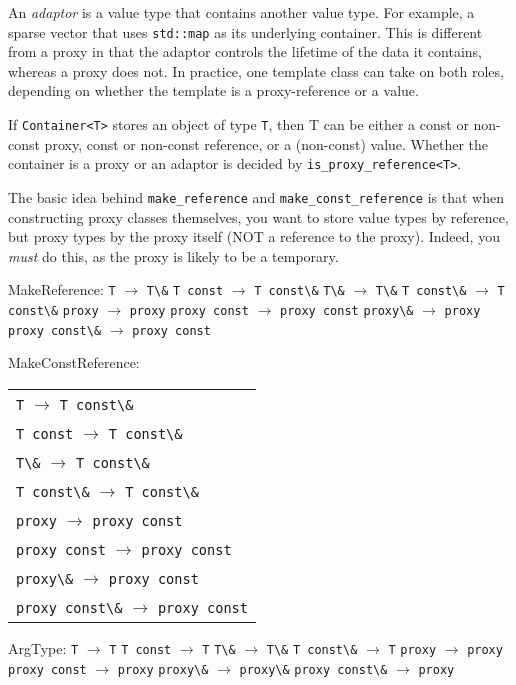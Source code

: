 \documentclass{article}
\begin{document}
An \textit{adaptor} is a value type that contains another value type.
For example, a sparse vector that uses \verb"std::map" as its
underlying container. This is different from a proxy in that the
adaptor controls the lifetime of the data it contains, whereas a proxy
does not. In practice, one template class can take on both roles,
depending on whether the template is a proxy-reference or a value.

If \verb"Container<T>" stores an object of type \verb"T", then T can
be either a const or non-const proxy, const or non-const reference, or
a (non-const) value. Whether the container is a proxy or an adaptor is
decided by \verb"is_proxy_reference<T>".

The basic idea behind \verb"make_reference" and \verb"make_const_reference"
is that when constructing proxy classes themselves, you want to store
value types by reference, but proxy types by the proxy itself (NOT a
reference to the proxy). Indeed, you \textit{must} do this, as the 
proxy is likely to be a temporary.

MakeReference:
\verb"T" $\rightarrow$ \verb"T\&"
\verb"T const" $\rightarrow$ \verb"T const\&"
\verb"T\&" $\rightarrow$ \verb"T\&"
\verb"T const\&" $\rightarrow$ \verb"T const\&"
\verb"proxy" $\rightarrow$ \verb"proxy"
\verb"proxy const" $\rightarrow$ \verb"proxy const"
\verb"proxy\&" $\rightarrow$ \verb"proxy"
\verb"proxy const\&" $\rightarrow$ \verb"proxy const"

MakeConstReference:
\begin{tabular}{l}
\verb"T" $\rightarrow$ \verb"T const\&"                  \\
\verb"T const" $\rightarrow$ \verb"T const\&"  \\
\verb"T\&" $\rightarrow$ \verb"T const\&"  \\
\verb"T const\&" $\rightarrow$ \verb"T const\&"  \\
\verb"proxy" $\rightarrow$ \verb"proxy const"  \\
\verb"proxy const" $\rightarrow$ \verb"proxy const"  \\
\verb"proxy\&" $\rightarrow$ \verb"proxy const"  \\
\verb"proxy const\&" $\rightarrow$ \verb"proxy const"
\end{tabular}

ArgType:
\verb"T" $\rightarrow$ \verb"T"
\verb"T const" $\rightarrow$ \verb"T" 
\verb"T\&" $\rightarrow$ \verb"T\&" 
\verb"T const\&" $\rightarrow$ \verb"T" 
\verb"proxy" $\rightarrow$ \verb"proxy" 
\verb"proxy const" $\rightarrow$ \verb"proxy" 
\verb"proxy\&" $\rightarrow$ \verb"proxy\&" 
\verb"proxy const\&" $\rightarrow$ \verb"proxy" 
\end{document}

